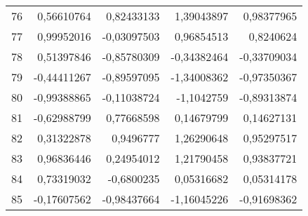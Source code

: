 \documentclass[12pt]{article}
\begin{document}
\begin{longtable}{lrrrr}
 76 & 0,56610764 & 0,82433133 & 1,39043897 & 0,98377965 \\
 77 & 0,99952016 & -0,03097503 & 0,96854513 &  0,8240624 \\
 78 & 0,51397846 & -0,85780309 & -0,34382464 & -0,33709034 \\
 79 & -0,44411267 & -0,89597095 & -1,34008362 & -0,97350367 \\
 80 & -0,99388865 & -0,11038724 & -1,1042759 & -0,89313874 \\
 81 & -0,62988799 & 0,77668598 & 0,14679799 & 0,14627131 \\
 82 & 0,31322878 &  0,9496777 & 1,26290648 & 0,95297517 \\
 83 & 0,96836446 & 0,24954012 & 1,21790458 & 0,93837721 \\
 84 & 0,73319032 & -0,6800235 & 0,05316682 & 0,05314178 \\
 85 & -0,17607562 & -0,98437664 & -1,16045226 & -0,91698362 \\
\end{longtable}
\end{document}

